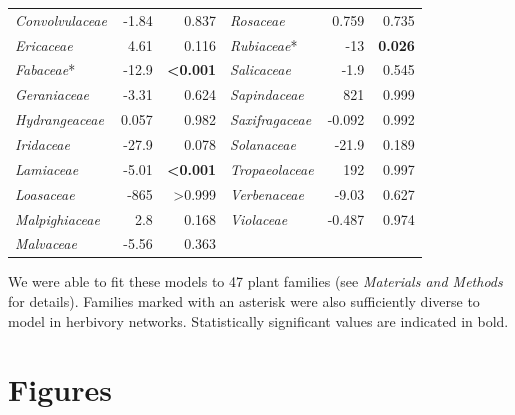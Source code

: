 \documentclass[12pt]{article}
\begin{document}
\begin{table}[!h]
\begin{tabular}{|l  rr|| l rr|}
    \emph{Convolvulaceae}   & -1.84 &  0.837  &     \emph{Rosaceae}   & 0.759 &  0.735 \\
    \emph{Ericaceae}  & 4.61  &  0.116  &     \emph{Rubiaceae}*   & -13 &  \textbf{0.026} \\
    \emph{Fabaceae}*  & -12.9 &  \textbf{\textless0.001}  &     \emph{Salicaceae}   & -1.9  &  0.545 \\
    \emph{Geraniaceae}  & -3.31 &  0.624  &     \emph{Sapindaceae}  & 821 &  0.999 \\
    \emph{Hydrangeaceae}  & 0.057 &  0.982  &     \emph{Saxifragaceae}  & -0.092  &  0.992 \\
    \emph{Iridaceae}  & -27.9 &  0.078  &     \emph{Solanaceae}   & -21.9 &  0.189 \\
    \emph{Lamiaceae}  & -5.01 &  \textbf{\textless0.001}  &     \emph{Tropaeolaceae}  & 192 &  0.997 \\
    \emph{Loasaceae}  & -865  &  \textgreater0.999  &     \emph{Verbenaceae}  & -9.03 &  0.627 \\
    \emph{Malpighiaceae}  & 2.8 &  0.168  &     \emph{Violaceae}  & -0.487  &  0.974 \\
    \emph{Malvaceae}  & -5.56 &  0.363  &   &   & \\
  \hline
  \end{tabular}
  \smallskip
  \footnotesize

    We were able to fit these models to 47 plant families (see \emph{Materials and Methods} for details). 
    Families marked with an asterisk were also sufficiently diverse to model in herbivory networks. 
    Statistically significant values are indicated in bold. 

    \end{table}

\clearpage


\section*{Figures}
\end{document}
